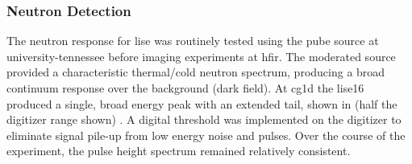 \documentclass[../../../main.tex]{subfiles}%
\begin{document}
%
    \Xsubsection%
    \subsubsection*{Neutron Detection}%
    \label{sec:chapter-4:semiconductor-response:neutron}%
    The neutron response for \gls{lise} was routinely tested using the \gls{pube} source at \gls{university-tennessee} before imaging experiments at \gls{hfir}.
    The moderated source provided a characteristic thermal/cold neutron spectrum, producing a broad continuum response over the background (dark field). 
    At \gls{cg1d} the \gls{lise16} produced a single, broad energy peak with an extended tail, shown in  (half the digitizer range shown) \cite{Herrera_2016}.
    A digital threshold was implemented on the digitizer to eliminate signal pile-up from low energy noise and pulses.
    Over the course of the experiment, the pulse height spectrum remained relatively consistent.
\end{document}
